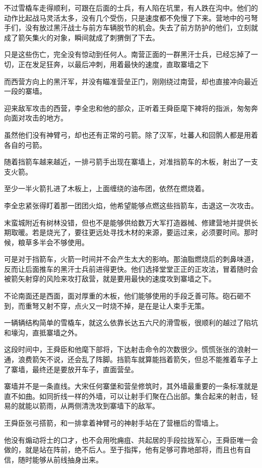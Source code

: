 不过雪橇车走得顺利，可跟在后面的士兵，有人陷在坑里，有人跌在沟中。他们的动作比起战马灵活太多，没有几个受伤，只是速度都不免慢了下来。营地中的弓弩手们，没有放过黑汗战士与前方车辆脱节的机会。失去了前方防护的他们，立刻就成了箭矢集火的对象，瞬间就成了刺猬倒了下去。

只是这些伤亡，完全没有惊动到任何人。南营正面的一群黑汗士兵，已经忘掉了一切，正在发足狂奔，以最后冲刺，用着最快的速度，直取寨墙之下

而西营方向上的黑汗军，并没有瞄准营垒正门，刚刚绕过南营，却也直接冲向最近一段的寨墙。

迎来敌军攻击的西营，李全忠和他的部众，正听着王舜臣麾下裨将的指派，匆匆奔向面对攻击的地方。

虽然他们没有神臂弓，却也还有正常的弓箭。除了汉军，吐蕃人和回鹘人都是用着各自的弓箭。

随着挡箭车越来越近，一排弓箭手出现在寨墙上，对准挡箭车的木板，射出了一支支火箭。

至少一半火箭扎进了木板上，上面缠绕的油布团，依然在燃烧着。

李全忠紧张得盯着那一团团火焰，他希望能够点燃这些挡箭车，击退这一次攻击。

末蛮城附近有树林没错，但也不是能够供给数万大军打造器械、修建营地并提供长期取暖。若是烧光了，要往更远处寻找木材的来源，要运过来，必须要时间。那时候，粮草多半会不够使用。

可是对于挡箭车，火箭一时间并不会产生太大的影响。那油脂燃烧后的刺鼻味道，反而让后面推车的黑汗士兵前进得更快。他们选择堂堂正正的正攻法，冒着随时会被箭矢射穿的风险来攻打敌营，就是要用最快的速度攻到寨墙之下。

不论南面还是西面，面对厚重的木板，他们能够使用的手段乏善可陈。砲石砸不到，而重弩又射不穿，点火又一时烧不掉，是在是让人束手无策。

一辆辆结构简单的雪橇车，就这么依靠长达五六尺的滑雪板，很顺利的越过了陷坑和壕沟，直抵寨墙之外。

这段时间中，王舜臣和他麾下部将，下达射击命令的次数很少。慌慌张张的浪射一通，浪费箭矢不说，还会乱了阵脚。挡箭车就算能挡着箭矢，但总不能推着车子上了寨墙，最终还是要放开车子，直面营垒。

寨墙并不是一条直线。大宋任何寨堡和营垒修筑时，其外墙最重要的一条标准就是直不如曲。如同折线一样的外墙，可以让射手们聚在凸出部。集合起来的射击，轻易的就能以箭雨，从两侧清洗攻到寨墙下的敌军。

王舜臣张弓搭箭，和一排拿着神臂弓的神射手站在了营栅后的雪墙上。

他没有煽动将士的口才，也不会用吮痈疽、共起居的手段拉拢军心，王舜臣唯一会做的，就是站在阵前，绝不后人。至于指挥，他有足够可靠地部将，而且也有自信，随时能够从前线抽身出来。

